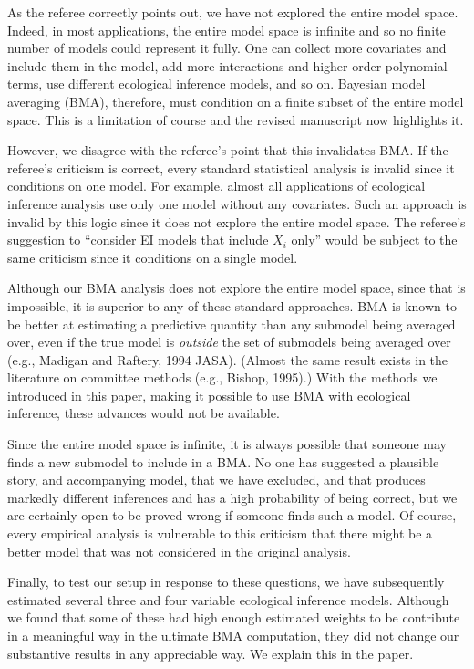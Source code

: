 \documentclass[11pt]{article}
\begin{document}
\begin{enumerate}
  As the referee correctly points out, we have not explored the entire
  model space. Indeed, in most applications, the entire model space is
  infinite and so no finite number of models could represent it fully.
  One can collect more covariates and include them in the model, add
  more interactions and higher order polynomial terms, use different
  ecological inference models, and so on.  Bayesian model averaging
  (BMA), therefore, must condition on a finite subset of the entire
  model space.  This is a limitation of course and the revised
  manuscript now highlights it.
  
  However, we disagree with the referee's point that this invalidates
  BMA. If the referee's criticism is correct, every standard
  statistical analysis is invalid since it conditions on one model.
  For example, almost all applications of ecological inference
  analysis use only one model without any covariates. Such an approach
  is invalid by this logic since it does not explore the entire model
  space.  The referee's suggestion to ``consider EI models that
  include $X_i$ only'' would be subject to the same criticism since it
  conditions on a single model.
  
  Although our BMA analysis does not explore the entire model space,
  since that is impossible, it is superior to any of these standard
  approaches.  BMA is known to be better at estimating a predictive
  quantity than any submodel being averaged over, even if the true
  model is {\it outside} the set of submodels being averaged over
  (e.g., Madigan and Raftery, 1994 JASA).  (Almost the same result
  exists in the literature on committee methods (e.g., Bishop, 1995).)
  With the methods we introduced in this paper, making it possible to
  use BMA with ecological inference, these advances would not be
  available.
  
  Since the entire model space is infinite, it is always possible that
  someone may finds a new submodel to include in a BMA.  No one has
  suggested a plausible story, and accompanying model, that we have
  excluded, and that produces markedly different inferences and has a
  high probability of being correct, but we are certainly open to be
  proved wrong if someone finds such a model.  Of course, every
  empirical analysis is vulnerable to this criticism that there might
  be a better model that was not considered in the original analysis.
  
  Finally, to test our setup in response to these questions, we have
  subsequently estimated several three and four variable ecological
  inference models.  Although we found that some of these had high
  enough estimated weights to be contribute in a meaningful way in the
  ultimate BMA computation, they did not change our substantive
  results in any appreciable way.  We explain this in the paper.


\end{enumerate}
\end{document}
